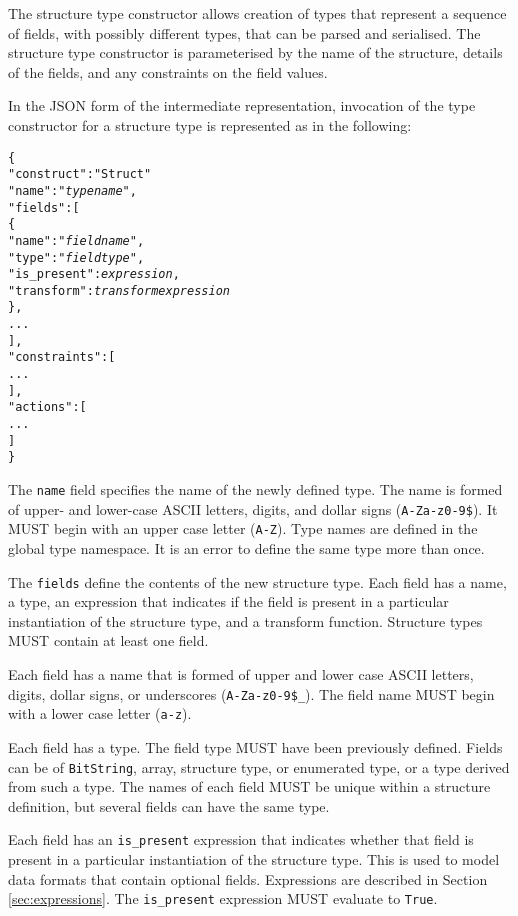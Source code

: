\documentclass[10pt,twocolumn,a4paper]{article}
\newcommand{\code}[1]{\texttt{#1}}
\begin{document}
The structure type constructor allows creation of types that represent a
sequence of fields, with possibly different types, that can be parsed and
serialised. The structure type constructor is parameterised by the name of
the structure, details of the fields, and any constraints on the field
values.

In the JSON form of the intermediate representation, invocation of the type
constructor for a structure type is represented as in the following:
\footnotesize
\begin{alltt}
  \{
    "construct"   : "Struct"
    "name"        : "\emph{type name}",
    "fields"      : [
      \{
        "name"       : "\emph{field name}",
        "type"       : "\emph{field type}",
        "is\_present" : \emph{expression},
        "transform"  : \emph{transform expression}
      \},
      ...
    ],
    "constraints" : [
      ...
    ],
    "actions" : [
      ...
    ]
  \}
\end{alltt}
\normalsize
The \code{name} field specifies the name of the newly defined type. The
name is formed of upper- and lower-case ASCII letters, digits, and dollar
signs (\code{A-Za-z0-9\$}).  It MUST begin with an upper case letter
(\code{A-Z}). Type names are defined in the global type namespace.
It is an error to define the same type more than once.

The \code{fields} define the contents of the new structure type. Each
field has a name, a type, an expression that indicates if the field is
present in a particular instantiation of the structure type, and a
transform function. Structure types MUST contain at least one field.

Each field has a name that is formed of upper and lower case ASCII letters,
digits, dollar signs, or underscores (\code{A-Za-z0-9\$\_}). The field name
MUST begin with a lower case letter (\code{a-z}).

Each field has a type. The field type MUST have been previously defined.
Fields can be of \code{BitString}, array, structure type, or enumerated type,
or a type derived from such a type. The names of each field MUST be unique
within a structure definition, but several fields can have the same type.

Each field has an \code{is\_present} expression that indicates
whether that field is present in a particular instantiation of the
structure type. This is used to model data formats that contain optional
fields. Expressions are described in Section \ref{sec:expressions}. The
\code{is\_present} expression MUST evaluate to \code{True}.
\end{document}
